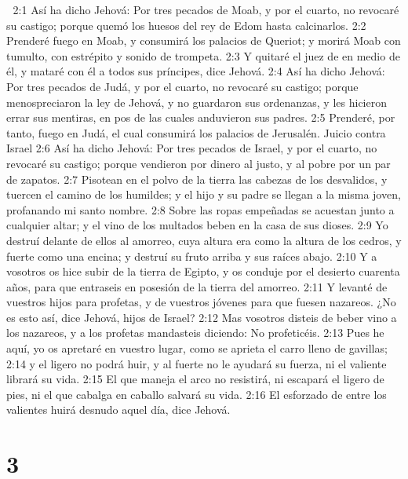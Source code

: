 
2:1 Así ha dicho Jehová: Por tres pecados de Moab, y por el cuarto, no revocaré su castigo; porque quemó los huesos del rey de Edom hasta calcinarlos.  
2:2 Prenderé fuego en Moab, y consumirá los palacios de Queriot; y morirá Moab con tumulto, con estrépito y sonido de trompeta.  
2:3 Y quitaré el juez de en medio de él, y mataré con él a todos sus príncipes, dice Jehová.  
2:4 Así ha dicho Jehová: Por tres pecados de Judá, y por el cuarto, no revocaré su castigo; porque menospreciaron la ley de Jehová, y no guardaron sus ordenanzas, y les hicieron errar sus mentiras, en pos de las cuales anduvieron sus padres.  
2:5 Prenderé, por tanto, fuego en Judá, el cual consumirá los palacios de Jerusalén.  
Juicio contra Israel  
2:6 Así ha dicho Jehová: Por tres pecados de Israel, y por el cuarto, no revocaré su castigo; porque vendieron por dinero al justo, y al pobre por un par de zapatos.  
2:7 Pisotean en el polvo de la tierra las cabezas de los desvalidos, y tuercen el camino de los humildes; y el hijo y su padre se llegan a la misma joven, profanando mi santo nombre.  
2:8 Sobre las ropas empeñadas se acuestan junto a cualquier altar; y el vino de los multados beben en la casa de sus dioses.  
2:9 Yo destruí delante de ellos al amorreo, cuya altura era como la altura de los cedros, y fuerte como una encina; y destruí su fruto arriba y sus raíces abajo.  
2:10 Y a vosotros os hice subir de la tierra de Egipto, y os conduje por el desierto cuarenta años, para que entraseis en posesión de la tierra del amorreo.  
2:11 Y levanté de vuestros hijos para profetas, y de vuestros jóvenes para que fuesen nazareos. ¿No es esto así, dice Jehová, hijos de Israel?  
2:12 Mas vosotros disteis de beber vino a los nazareos, y a los profetas mandasteis diciendo: No profeticéis.  
2:13 Pues he aquí, yo os apretaré en vuestro lugar, como se aprieta el carro lleno de gavillas;  
2:14 y el ligero no podrá huir, y al fuerte no le ayudará su fuerza, ni el valiente librará su vida.  
2:15 El que maneja el arco no resistirá, ni escapará el ligero de pies, ni el que cabalga en caballo salvará su vida.  
2:16 El esforzado de entre los valientes huirá desnudo aquel día, dice Jehová.  

\chapter{3}


